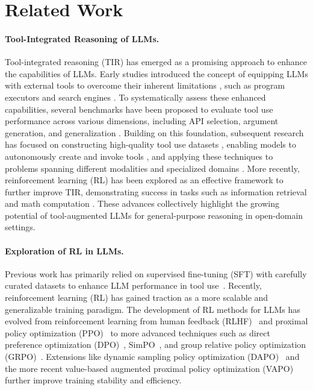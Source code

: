 \section{Related Work}

\paragraph{Tool-Integrated Reasoning of LLMs.}
Tool-integrated reasoning (TIR) has emerged as a promising approach to enhance the capabilities of LLMs. Early studies introduced the concept of equipping LLMs with external tools to overcome their inherent limitations \cite{schick2023toolformer, qin2024tool, yao2023react}, such as program executors \cite{chen2022program} and search engines \cite{vu2023freshllms}. To systematically assess these enhanced capabilities, several benchmarks have been proposed to evaluate tool use performance across various dimensions, including API selection, argument generation, and generalization \cite{qin2023toolllm, patil2023gorilla, qian2024escapebench}. Building on this foundation, subsequent research has focused on constructing high-quality tool use datasets \cite{liu2024toolace, qian2025smart}, enabling models to autonomously create and invoke tools \cite{qian2023creator, qian2024toolink}, and applying these techniques to problems spanning different modalities \cite{shen2025vlm} and specialized domains \cite{ling2023domain}. More recently, reinforcement learning (RL) has been explored as an effective framework to further improve TIR, demonstrating success in tasks such as information retrieval \cite{jin2025search} and math computation \cite{li2025torl}. These advances collectively highlight the growing potential of tool-augmented LLMs for general-purpose reasoning in open-domain settings.


\paragraph{Exploration of RL in LLMs.}
Previous work has primarily relied on supervised fine-tuning (SFT) with carefully curated datasets to enhance LLM performance in tool use~\cite{schick2023toolformer, qin2023toolllm}. Recently, reinforcement learning (RL) has gained traction as a more scalable and generalizable training paradigm. The development of RL methods for LLMs has evolved from reinforcement learning from human feedback (RLHF)~\cite{kaufmann2023survey} and proximal policy optimization (PPO)~\cite{schulman2017proximal} to more advanced techniques such as direct preference optimization (DPO)~\cite{rafailov2023direct}, SimPO~\cite{meng2024simpo}, and group relative policy optimization (GRPO)~\cite{shao2024deepseekmath}. Extensions like dynamic sampling policy optimization (DAPO)~\cite{yu2025dapo} and the more recent value-based augmented proximal policy optimization (VAPO)~\cite{yuan2025vapo} further improve training stability and efficiency.

